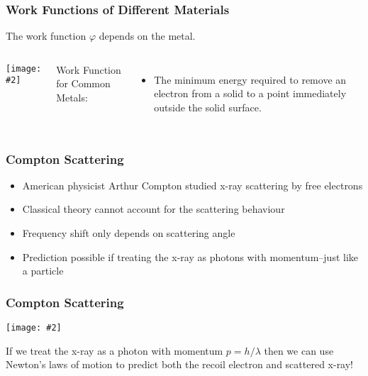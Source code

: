 \documentclass[12pt,compress,aspectratio=169]{beamer}
\newcommand{\pic}[2]{\texttt{[image: \#2]}}
\newcommand{\eq}[2]{\vspace{#1}{\Large\begin{displaymath}#2\end{displaymath}}}
\begin{document}
\begin{frame}
  \frametitle{Work Functions of Different Materials}
  The work function $\varphi$ depends on the metal.
  \begin{columns}
    \pic{1}{work-function.png}
    
    Work Function for Common Metals:
    \begin{itemize}
    \item The minimum energy required to remove an electron from a solid to a
      point immediately outside the solid surface.
    \end{itemize}
  \end{columns}
\end{frame}


\begin{frame}
  \frametitle{Compton Scattering}
  \begin{itemize}
  \item American physicist Arthur Compton studied x-ray scattering by
    free electrons
  \item Classical theory cannot account for the scattering behaviour
  \item Frequency shift only depends on scattering angle
  \item Prediction possible if treating the x-ray as photons with
    momentum--just like a particle
  \end{itemize}

  \eq{-.3in}{
    \boxed{p=\frac{E}{c}=\frac{hf}{c}=\frac{h}{\lambda}}
  }
\end{frame}

\begin{frame}
  \frametitle{Compton Scattering}
  \begin{center}
    \pic{.5}{compton2.png}
  \end{center}
  If we treat the x-ray as a photon with momentum $p=h/\lambda$ then we can
  use Newton's laws of motion to predict both the recoil electron and scattered
  x-ray!
\end{frame}
\end{document}

